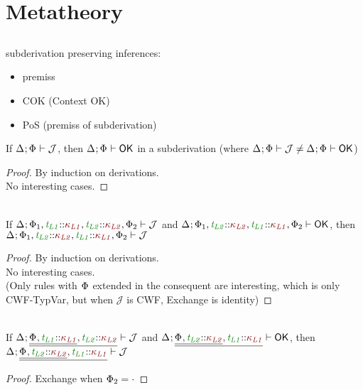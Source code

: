 \documentclass[11pt]{article}
\begin{document}
\section{Metatheory}
    \subsection*{}
    subderivation preserving inferences:
    \begin{itemize}
        \item premiss
        \item COK (Context OK)
        \item PoS (premiss of subderivation)
    \end{itemize}
    \begin{lemma}[COK]
        If $\J$, then $\ContextWellFormed$ in a subderivation (where $\J\neq\ContextWellFormed$)
    \end{lemma}
    \begin{proof}
        By induction on derivations. \\
        No interesting cases.
    \end{proof}
    \noindent\hrulefill
    \begin{lemma}[Exchange]
        \vphantom{.}\\
        If $\J[\HoleCtx\TypVarCtx[][1],\typvar[L1]\KndAssump\knd[L1],\typvar[L2]\KndAssump\knd[L2],\TypVarCtx[][2]]$ and $\ContextWellFormed[\HoleCtx\TypVarCtx[][1],\typvar[L2]\KndAssump\knd[L2],\typvar[L1]\KndAssump\knd[L1],\TypVarCtx[][2]]$, then $\J[\HoleCtx\TypVarCtx[][1],\typvar[L2]\KndAssump\knd[L2],\typvar[L1]\KndAssump\knd[L1],\TypVarCtx[][2]]$
    \end{lemma}
    \begin{proof}
        By induction on derivations. \\
        No interesting cases. \\
        (Only rules with $\TypVarCtx$ extended in the consequent are interesting, which is only CWF-TypVar, but when $\mathcal{J}$ is CWF, Exchange is identity)
    \end{proof}
    \begin{corollary}
        \vphantom{.}\\
        If $\J[\HoleCtx\xxExtendTypVarCtx[][L1]{\knd[L1]}[L2]{\knd[L2]}]$ and $\ContextWellFormed[\HoleCtx\xxExtendTypVarCtx[][L2]{\knd[L2]}[L1]{\knd[L1]}]$, then $\J[\HoleCtx\xxExtendTypVarCtx[][L2]{\knd[L2]}[L1]{\knd[L1]}]$
    \end{corollary}
    \begin{proof}
        Exchange when $\TypVarCtx[][2]=\cdot$
    \end{proof}
\end{document}
